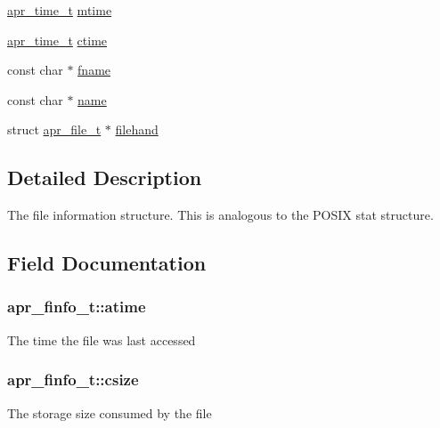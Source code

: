 \begin{DoxyCompactItemize}
\item 
\hyperlink{group__apr__time_gadb4bde16055748190eae190c55aa02bb}{apr\+\_\+time\+\_\+t} \hyperlink{structapr__finfo__t_afc3bec0f6b3b10160428ba5602a41c60}{mtime}
\item 
\hyperlink{group__apr__time_gadb4bde16055748190eae190c55aa02bb}{apr\+\_\+time\+\_\+t} \hyperlink{structapr__finfo__t_aebbdb3dc755d825de3dce901cfba0883}{ctime}
\item 
const char $\ast$ \hyperlink{structapr__finfo__t_acfed83ab2943ee7a58a215aa1cfd9e47}{fname}
\item 
const char $\ast$ \hyperlink{structapr__finfo__t_a2915f9141ea76ae3672ccf9eb0fa77bb}{name}
\item 
struct \hyperlink{structapr__file__t}{apr\+\_\+file\+\_\+t} $\ast$ \hyperlink{structapr__finfo__t_a7858e3d9c5f6ed062d9ff7f5c79b6336}{filehand}
\end{DoxyCompactItemize}


\subsection{Detailed Description}
The file information structure. This is analogous to the P\+O\+S\+IX stat structure. 

\subsection{Field Documentation}
\subsubsection[{\texorpdfstring{atime}{atime}}]{ apr\+\_\+finfo\+\_\+t\+::atime}\hypertarget{structapr__finfo__t_ad78874e5751e9bba30debb0826eb96a7}{}\label{structapr__finfo__t_ad78874e5751e9bba30debb0826eb96a7}
The time the file was last accessed 
\subsubsection[{\texorpdfstring{csize}{csize}}]{ apr\+\_\+finfo\+\_\+t\+::csize}\hypertarget{structapr__finfo__t_aeaa4a4def98ad4f162e05c2e2292321d}{}\label{structapr__finfo__t_aeaa4a4def98ad4f162e05c2e2292321d}
The storage size consumed by the file 
